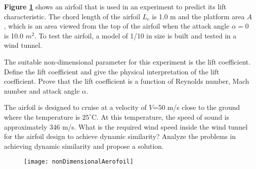		
		\listclose

	
	\clearpage 
\finalpage
	
	\item \label{b} \textbf{Figure \ref{fig:nonDimensionalAerofoil}} shows an airfoil that is used in an experiment to predict its lift characteristic. The chord length of the airfoil $L_{c}$ is 1.0 m and the platform area $A$, which is an area viewed from the top of the airfoil when the attack angle $\alpha = 0$ is 10.0 $m^{2}$. To test the airfoil, a model of 1/10 in size is built and tested in a wind tunnel.  
	
	

\listbegin

	\item \label{b1} The suitable non-dimensional parameter for this experiment is the lift coefficient. Define the lift coefficient and give the physical interpretation of the lift coefficient. Prove that the lift coefficient is a function of Reynolds number, Mach number and attack angle $\alpha$.    
	

	
	\item The airfoil is designed to cruise at a velocity of $V$=50 m/s close to the ground where the temperature is $25^{\circ}$C. At this temperature, the speed of sound is approximately 346 m/s. What is the required wind speed inside the wind tunnel for the airfoil design to achieve dynamic similarity? Analyze the problems in achieving dynamic similarity and propose a solution.
	


\listclose

		\begin{figure}[H] %
		\centering
		\texttt{[image: nonDimensionalAerofoil]}
		\caption{\rajah}
		\label{fig:nonDimensionalAerofoil}
	    \end{figure}	


\listclose	%

\paperend
